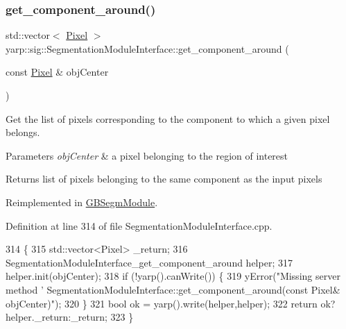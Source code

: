 \subsubsection{\texorpdfstring{get\+\_\+component\+\_\+around()}{get\_component\_around()}}
{\footnotesize\ttfamily std\+::vector$<$ \hyperlink{classyarp_1_1sig_1_1Pixel}{Pixel} $>$ yarp\+::sig\+::\+Segmentation\+Module\+Interface\+::get\+\_\+component\+\_\+around (\begin{DoxyParamCaption}\item[{const \hyperlink{classyarp_1_1sig_1_1Pixel}{Pixel} \&}]{obj\+Center }\end{DoxyParamCaption})\hspace{0.3cm}{\ttfamily [virtual]}}



Get the list of pixels corresponding to the component to which a given pixel belongs. 


\begin{DoxyParams}{Parameters}
{\em obj\+Center} & a pixel belonging to the region of interest \\
\hline
\end{DoxyParams}
\begin{DoxyReturn}{Returns}
list of pixels belonging to the same component as the input pixels 
\end{DoxyReturn}


Reimplemented in \hyperlink{classGBSegmModule_a0b63c53513e67c4f126e29cf7f28ad53}{G\+B\+Segm\+Module}.



Definition at line 314 of file Segmentation\+Module\+Interface.\+cpp.


\begin{DoxyCode}
314                                                                                           \{
315   std::vector<Pixel>  \_return;
316   SegmentationModuleInterface\_get\_component\_around helper;
317   helper.init(objCenter);
318   \textcolor{keywordflow}{if} (!yarp().canWrite()) \{
319     yError(\textcolor{stringliteral}{"Missing server method '%
       SegmentationModuleInterface::get\_component\_around(const Pixel& objCenter)"});
320   \}
321   \textcolor{keywordtype}{bool} ok = yarp().write(helper,helper);
322   \textcolor{keywordflow}{return} ok?helper.\_return:\_return;
323 \}
\end{DoxyCode}
\mbox{\label{classyarp_1_1sig_1_1SegmentationModuleInterface_a91f3d872a48599337d1d2f365ac4c31e}} 
